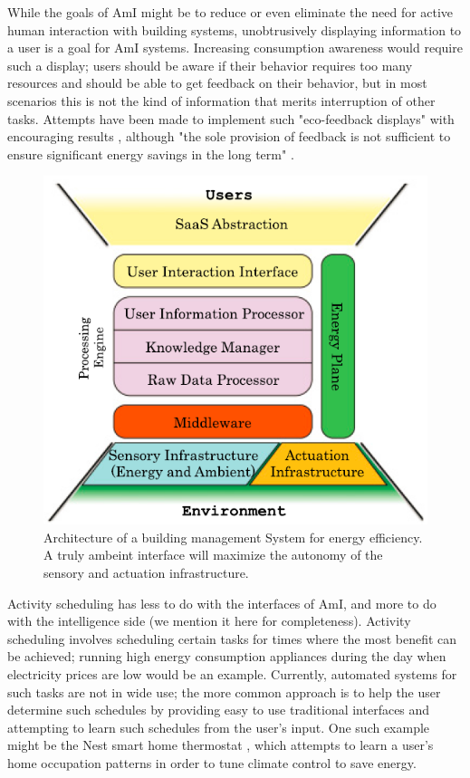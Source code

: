 \documentclass{article}
\begin{document}
While the goals of AmI might be to reduce or even eliminate the need for active human interaction with building systems, unobtrusively displaying information to a user is a goal for AmI systems. Increasing consumption awareness would require such a display; users should be aware if their behavior requires too many resources and should be able to get feedback on their behavior, but in most scenarios this is not the kind of information that merits interruption of other tasks. Attempts have been made to implement such "eco-feedback displays" with encouraging results \cite{7390646}, although "the sole provision of
feedback is not sufficient to ensure significant energy savings in the long term" \cite{DePaola:2014:IMS:2620784.2611779}.

\begin{figure}
  \begin{center}
    \includegraphics[width=.8\linewidth]{smart_building_architecture}
  \end{center}
  \caption{Architecture of a building management System for energy efficiency. A truly ambeint interface will maximize the autonomy of the sensory and actuation infrastructure. \cite{DePaola:2014:IMS:2620784.2611779}}
  \label{smart-building}
\end{figure}

Activity scheduling has less to do with the interfaces of AmI, and more to do with the intelligence side (we mention it here for completeness). Activity scheduling involves scheduling certain tasks for times where the most benefit can be achieved; running high energy consumption appliances during the day when electricity prices are low would be an example. Currently, automated systems for such tasks are not in wide use; the more common approach is to help the user determine such schedules by providing easy to use traditional interfaces and attempting to learn such schedules from the user's input. One such example might be the Nest smart home thermostat \cite{nest}, which attempts to learn a user's home occupation patterns in order to tune climate control to save energy.
\end{document}
